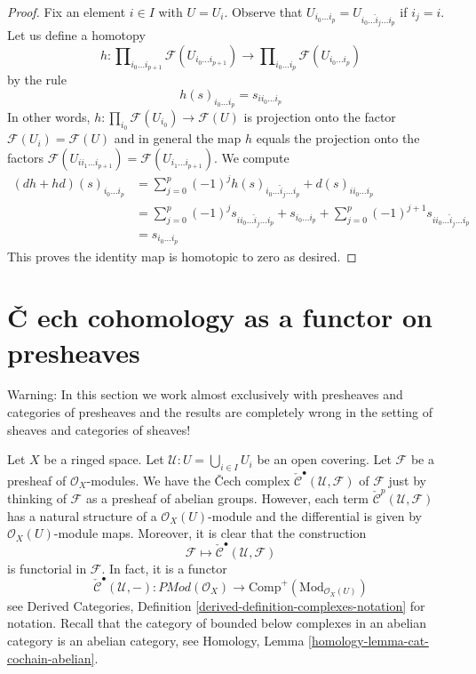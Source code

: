 \begin{proof}
Fix an element $i \in I$ with $U = U_i$. Observe that
$U_{i_0 \ldots i_p} = U_{i_0 \ldots \hat i_j \ldots i_p}$ if $i_j = i$.
Let us define a homotopy
$$
h :
\prod\nolimits_{i_0 \ldots i_{p + 1}} \mathcal{F}(U_{i_0 \ldots i_{p + 1}})
\longrightarrow
\prod\nolimits_{i_0 \ldots i_p} \mathcal{F}(U_{i_0 \ldots i_p})
$$
by the rule
$$
h(s)_{i_0 \ldots i_p} = s_{i i_0 \ldots i_p}
$$
In other words, $h : \prod_{i_0} \mathcal{F}(U_{i_0}) \to \mathcal{F}(U)$
is projection onto the factor $\mathcal{F}(U_i) = \mathcal{F}(U)$
and in general the map $h$ equals the projection onto the factors
$\mathcal{F}(U_{i i_1 \ldots i_{p + 1}}) =
\mathcal{F}(U_{i_1 \ldots i_{p + 1}})$.
We compute
\begin{align*}
(dh + hd)(s)_{i_0 \ldots i_p}
& =
\sum\nolimits_{j = 0}^p
(-1)^j
h(s)_{i_0 \ldots \hat i_j \ldots i_p}
+
d(s)_{i i_0 \ldots i_p}\\
& =
\sum\nolimits_{j = 0}^p
(-1)^j
s_{i i_0 \ldots \hat i_j \ldots i_p}
+
s_{i_0 \ldots i_p}
+
\sum\nolimits_{j = 0}^p
(-1)^{j + 1}
s_{i i_0 \ldots \hat i_j \ldots i_p} \\
& =
s_{i_0 \ldots i_p}
\end{align*}
This proves the identity map is homotopic to zero as desired.
\end{proof}

\section{{\v C}
ech cohomology as a functor on presheaves}
\label{cohomology-section-cech-functor}

Warning: In this section we work almost exclusively with presheaves and
categories of presheaves and the results are completely wrong in the
setting of sheaves and categories of sheaves!

\medskip\noindent
Let $X$ be a ringed space.
Let $\mathcal{U} : U = \bigcup_{i \in I} U_i$ be an open covering.
Let $\mathcal{F}$ be a presheaf of $\mathcal{O}_X$-modules.
We have the {\v C}ech complex
$\check{\mathcal{C}}^\bullet(\mathcal{U}, \mathcal{F})$
of $\mathcal{F}$ just by thinking of $\mathcal{F}$
as a presheaf of abelian groups. However, each term
$\check{\mathcal{C}}^p(\mathcal{U}, \mathcal{F})$ has a natural
structure of a $\mathcal{O}_X(U)$-module and the differential is given by
$\mathcal{O}_X(U)$-module maps. Moreover, it is clear that the
construction
$$
\mathcal{F} \longmapsto \check{\mathcal{C}}^\bullet(\mathcal{U}, \mathcal{F})
$$
is functorial in $\mathcal{F}$. In fact, it is a functor
\begin{equation}
\label{equation-cech-functor}
\check{\mathcal{C}}^\bullet(\mathcal{U}, -) :
\textit{PMod}(\mathcal{O}_X)
\longrightarrow
\text{Comp}^{+}(\text{Mod}_{\mathcal{O}_X(U)})
\end{equation}
see
Derived Categories, Definition \ref{derived-definition-complexes-notation}
for notation. Recall that the category of bounded below complexes
in an abelian category is an abelian category, see
Homology, Lemma \ref{homology-lemma-cat-cochain-abelian}.

